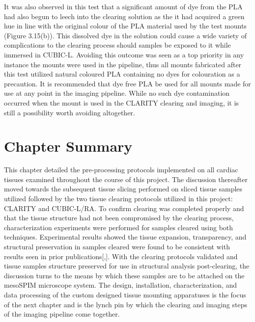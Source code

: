 It was also observed in this test that a significant amount of dye from the PLA had also begun to leech into the clearing solution as the it had acquired a green hue in line with the original colour of the PLA material used by the test mounts (Figure 3.15(b)). This dissolved dye in the solution could cause a wide variety of complications to the clearing process should samples be exposed to it while immersed in CUBIC-L. Avoiding this outcome was seen as a top priority in any instance the mounts were used in the pipeline, thus all mounts fabricated after this test utilized natural coloured PLA containing no dyes for colouration as a precaution. It is recommended that dye free PLA be used for all mounts made for use at any point in the imaging pipeline. While no such dye contamination occurred when the mount is used in the CLARITY clearing and imaging, it is still a possibility worth avoiding altogether. 

\section{Chapter Summary}

This chapter detailed the pre-processing protocols implemented on all cardiac tissues examined throughout the course of this project. The discussion thereafter moved towards the subsequent tissue slicing performed on sliced tissue samples utilized followed by the two tissue clearing protocols utilized in this project: CLARITY and CUBIC-L/RA. To confirm clearing was completed properly and that the tissue structure had not been compromised by the clearing process, characterization experiments were performed for samples cleared using both techniques. Experimental results showed the tissue expansion, transparency, and structural preservation in samples cleared were found to be consistent with results seen in prior publications[,]. With the clearing protocols validated and tissue samples structure preserved for use in structural analysis post-clearing, the discussion turns to the means by which these samples are to be attached on the mesoSPIM microscope system. The design, installation, characterization, and data processing of the custom designed tissue mounting apparatuses is the focus of the next chapter and is the lynch pin by which the clearing and imaging steps of the imaging pipeline come together.



